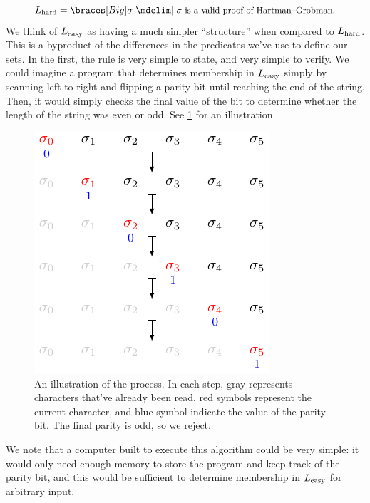 \documentclass{fkpaper}
\begin{document}
\begin{multicols}{2}
\[
  L_{\rm hard} = \set[Big]{\sigma \MID \text{\small $\sigma$ is a
      valid proof of Hartman–Grobman.}}
\]
We think of $L_{\rm easy}$ as having a much simpler ``structure'' when
compared to $L_{\rm hard}$. This is a byproduct of the differences in
the predicates we've use to define our sets. In the first, the rule is
very simple to state, and very simple to verify. We could imagine a
program that determines membership in $L_{\rm easy}$ simply by
scanning left-to-right and flipping a parity bit until reaching the
end of the string. Then, it would simply checks the final value of the
bit to determine whether the length of the string was even or odd. See
\cref{fig:illustration-of-process} for an illustration.
\begin{figure}[H]
  \centering
  \includegraphics{figures/parity-checker.pdf}
  \caption{An illustration of the process. In each step, gray
    represents characters that've already been read, red symbols
    represent the current character, and blue symbol indicate the
    value of the parity bit. The final parity is odd, so we reject.}
  \label{fig:illustration-of-process}
\end{figure}
We note that a computer built to execute this algorithm could be very
simple: it would only need enough memory to store the program and keep
track of the parity bit, and this would be sufficient to determine
membership in $L_{\rm easy}$ for arbitrary input.


\end{multicols}
\end{document}
